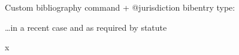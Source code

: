 %




\usepackage[
				bookmarks,
            colorlinks=true,        
            allcolors = black,  
            citecolor=blue, 
            hyperindex=false,       
]{hyperref}


\newcommand\putbrackets[1]{[#1]}




Custom bibliography command + @jurisdiction bibentry type:

\ldots in a recent case\cite[at 15]{sc12} and as required by statute\cite[s 4]{hba}

x\cite{sigfridsson,reese,kullback:related}

\printbibliography%
 
